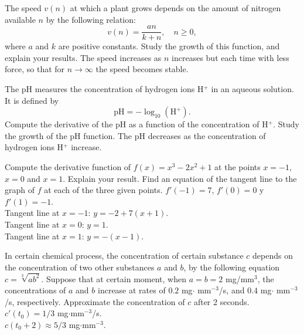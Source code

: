 {The speed $v(n)$ at which a plant grows depends on the amount of nitrogen available $n$ by the following relation:
\[
v(n) = \frac{an}{k+n},	\quad n\geq 0,
\]
where $a$ and $k$ are positive constants.
Study the growth of this function, and explain your results.
}
{The speed increases as $n$ increases but each time with less force, so that for $n\rightarrow \infty$ the speed becomes stable. }
{
}


{The pH measures the concentration of hydrogen ions H$^+$ in an aqueous solution.
It is defined by
\[
\mbox{pH} = -\log_{10}(\mbox{H}^+).
\]
Compute the derivative of the pH as a function of the concentration of H$^+$.
Study the growth of the pH function.
}
{The pH decreases as the concentration of hydrogen ions H$^+$ increase.
}
{
}


{Compute the derivative function of $f(x)=x^3-2x^2+1$ at the points $x=-1$, $x=0$ and $x=1$.
Explain your result.
Find an equation of the tangent line to the graph of $f$ at each of the three given points.
}
{$f'(-1)=7$, $f'(0)=0$ y $f'(1)=-1$.\\
Tangent line at $x=-1$: $y=-2+7(x+1)$.\\
Tangent line at $x=0$: $y=1$.\\
Tangent line at $x=1$: $y=-(x-1)$.
}
{
}

{
In certain chemical process, the concentration of certain substance $c$ depends on the concentration of two other substances $a$
and $b$, by the following equation $c=\sqrt[3]{ab^2}$.
Suppose that at certain moment, when $a=b=2$ mg/mm$^3$, the concentrations of $a$ and $b$ increase at rates of $0.2$ mg$\cdot$ mm$^{-3}$/s, and
$0.4$ mg$\cdot$ mm$^{-3}$/s, respectively.
Approximate the concentration of $c$ after 2 seconds.
}
{$c'(t_0)=1/3$ mg$\cdot$mm$^{-3}$/s.\\
$c(t_0+2)\approx 5/3$  mg$\cdot$mm$^{-3}$.
}
{
}
